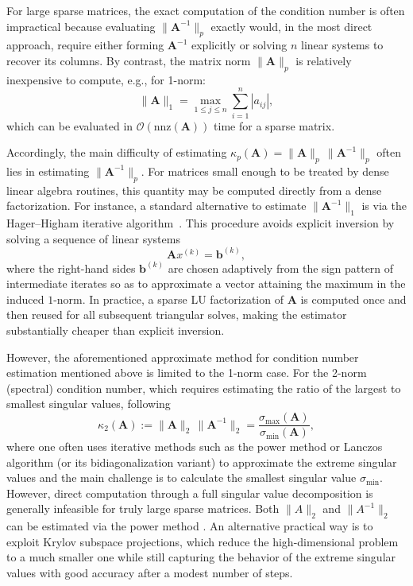 \documentclass[11pt,a4paper]{article}
\theoremstyle{plain}
\theoremstyle{definition}
\theoremstyle{remark}
\begin{document}
For large sparse matrices, the exact computation of the condition number is often impractical because evaluating $\|\mathbf{A}^{-1}\|_p$ exactly would, in the most direct approach, require either forming $\mathbf{A}^{-1}$ explicitly or solving $n$ linear systems to recover its columns. By contrast, the matrix norm $\|\mathbf{A}\|_p$ is relatively inexpensive to compute, e.g., for 1-norm:
\begin{equation}
\|\mathbf{A}\|_1 = \max_{1 \le j \le n} \sum_{i=1}^n |a_{ij}|,
\end{equation}
which can be evaluated in $\mathcal{O}(\mathrm{nnz}(\mathbf{A}))$ time for a sparse matrix.

Accordingly, the main difficulty  of estimating $\kappa_p(\mathbf{A}) = \|\mathbf{A}\|_p \, \|\mathbf{A}^{-1}\|_p$ often lies in estimating $\|\mathbf{A}^{-1}\|_p$. For matrices small enough to be treated by dense linear algebra routines, this quantity may be computed directly from a dense factorization. For instance, a standard alternative to estimate $\|\mathbf{A}^{-1}\|_1$ is via the Hager--Higham iterative algorithm~\cite{hager1984condition,higham1988estimating}. This procedure avoids explicit inversion by solving a sequence of linear systems
\begin{equation}
\mathbf{A} x^{(k)} = \mathbf{b}^{(k)},
\end{equation}
where the right-hand sides $\mathbf{b}^{(k)}$ are chosen adaptively from the sign pattern of intermediate iterates so as to approximate a vector attaining the maximum in the induced $1$-norm. In practice, a sparse LU factorization of $\mathbf{A}$ is computed once and then reused for all subsequent triangular solves, making the estimator substantially cheaper than explicit inversion.

However, the aforementioned approximate method for condition number estimation mentioned above is limited to the 1-norm case. For the 2-norm (spectral) condition number, which requires estimating the ratio of the largest to smallest singular values, following
\begin{equation}
\kappa_2(\mathbf{A}) := \|\mathbf{A}\|_2 \, \|\mathbf{A}^{-1}\|_2
= \frac{\sigma_{\max}(\mathbf{A})}{\sigma_{\min}(\mathbf{A})},
\end{equation}
where one often uses iterative methods such as the power method or Lanczos algorithm (or its bidiagonalization variant) to approximate the extreme singular values \cite{golub2013matrix} and  the main challenge is to calculate the smallest singular value $\sigma_{\min}$. However, direct computation through a full singular value decomposition is generally infeasible for truly large sparse matrices. Both $\|A\|_2$ and $\|A^{-1}\|_2$ can be estimated via the power method \cite{10.5555/59657}. An alternative practical way is to exploit Krylov subspace projections, which reduce the high-dimensional problem to a much smaller one while still capturing the behavior of the extreme singular values with good accuracy after a modest number of steps.
\end{document}
